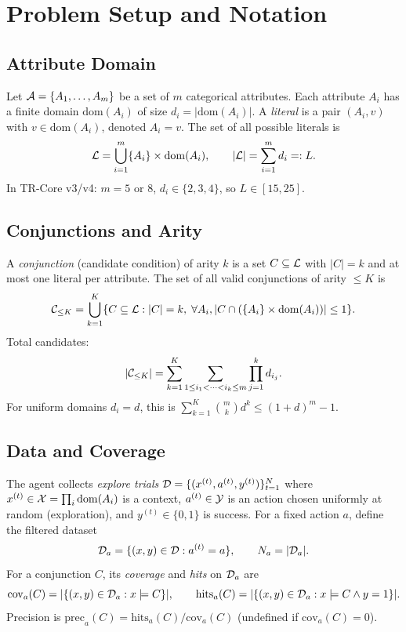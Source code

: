 

\section{Problem Setup and Notation}

\subsection{Attribute Domain}
Let $\mathcal{A} = \{A_1, \dots, A_m\}$ be a set of $m$ categorical attributes. Each attribute $A_i$ has a finite domain $\mathrm{dom}(A_i)$ of size $d_i = |\mathrm{dom}(A_i)|$. A \emph{literal} is a pair $(A_i, v)$ with $v \in \mathrm{dom}(A_i)$, denoted $A_i = v$. The set of all possible literals is
\[
\mathcal{L} = \bigcup_{i=1}^m \{A_i\} \times \mathrm{dom}(A_i), \qquad |\mathcal{L}| = \sum_{i=1}^m d_i =: L.
\]
In TR-Core v3/v4: $m=5$ or $8$, $d_i \in \{2,3,4\}$, so $L \in [15, 25]$.

\subsection{Conjunctions and Arity}
A \emph{conjunction} (candidate condition) of arity $k$ is a set $C \subseteq \mathcal{L}$ with $|C| = k$ and at most one literal per attribute. The set of all valid conjunctions of arity $\leq K$ is
\[
\mathcal{C}_{\leq K} = \bigcup_{k=1}^K \{ C \subseteq \mathcal{L} : |C|=k,\; \forall A_i, |C \cap (\{A_i\}\times\mathrm{dom}(A_i))| \leq 1 \}.
\]
Total candidates:
\[
|\mathcal{C}_{\leq K}| = \sum_{k=1}^K \sum_{1 \leq i_1 < \dots < i_k \leq m} \prod_{j=1}^k d_{i_j}.
\]
For uniform domains $d_i = d$, this is $\sum_{k=1}^K \binom{m}{k} d^k \leq (1+d)^m - 1$.

\subsection{Data and Coverage}
The agent collects \emph{explore trials} $\mathcal{D} = \{(x^{(t)}, a^{(t)}, y^{(t)})\}_{t=1}^N$ where $x^{(t)} \in \mathcal{X} = \prod_i \mathrm{dom}(A_i)$ is a context, $a^{(t)} \in \mathcal{Y}$ is an action chosen uniformly at random (exploration), and $y^{(t)} \in \{0,1\}$ is success. For a fixed action $a$, define the filtered dataset
\[
\mathcal{D}_a = \{(x, y) \in \mathcal{D} : a^{(t)} = a\}, \qquad N_a = |\mathcal{D}_a|.
\]
For a conjunction $C$, its \emph{coverage} and \emph{hits} on $\mathcal{D}_a$ are
\[
\mathrm{cov}_a(C) = |\{(x,y) \in \mathcal{D}_a : x \models C\}|, \qquad
\mathrm{hits}_a(C) = |\{(x,y) \in \mathcal{D}_a : x \models C \land y=1\}|.
\]
Precision is $\mathrm{prec}_a(C) = \mathrm{hits}_a(C) / \mathrm{cov}_a(C)$ (undefined if $\mathrm{cov}_a(C)=0$).

